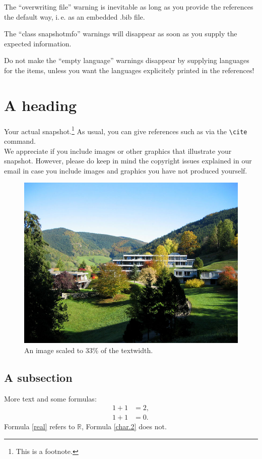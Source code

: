 \documentclass{snapshotmfo}
\begin{document}
The ``overwriting file'' warning is inevitable as long as you provide the references the default
way, i.\,e. as an embedded .bib file.

The ``class snapshotmfo'' warnings will disappear as soon as you supply the expected information.

Do not make the ``empty language'' warnings disappear by supplying languages for the items,
unless you want the languages explicitely printed in the references!


\section[Optional plain text substitute for PDF bookmark]{A heading}
Your actual snapshot.\footnote{This is a footnote.} As usual, you can give references such as \cite{knuth1984texbook, wikiMath, sample13, sample12, sample11, sample14} via the \verb+\cite+ command.\\

We appreciate if you include images or other graphics that illustrate your snapshot. However, please do keep in mind the copyright issues explained in our email in case you include images and graphics you have not produced yourself.

\begin{figure}[ht]
        \centering 
        \includegraphics[width= 0.33 \textwidth]{mfo.jpg}
        \caption{An image scaled to 33\% of the textwidth.}
\label{fig:sample-image}
\end{figure}

\subsection[Optional plain text substitute for PDF bookmark]{A subsection}
More text and some formulas:
\begin{align}\label{real}
1+1&=2,\\\label{char.2}
1+1&=0.
\end{align}
Formula \eqref{real} refers to $\mathbb{R}$, Formula \eqref{char.2} does not.
\end{document}
